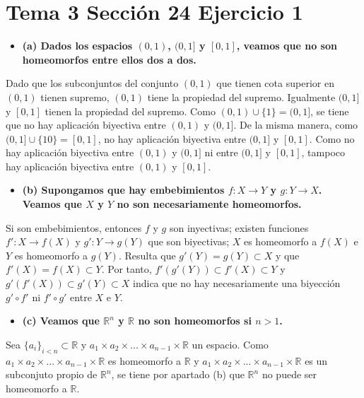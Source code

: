 \documentclass{article}
\begin{document}
\section{Tema 3 Sección 24 Ejercicio 1}
\begin{itemize}
\item \bf (a) \rm Dados los espacios $(0,1)$, $(0,1]$ y $[0,1]$, veamos que no son homeomorfos entre ellos dos a dos.
\end{itemize}
Dado que los subconjuntos del conjunto $(0,1)$ que tienen cota superior en $(0,1)$ tienen supremo, $(0,1)$ tiene la propiedad del supremo. Igualmente $(0,1]$ y $[0,1]$ tienen la propiedad del supremo. Como $(0,1)\cup \{1\}=(0,1]$, se tiene que no hay aplicación biyectiva entre $(0,1)$ y $(0,1]$. De la misma manera, como $(0,1]\cup \{1
0\}=[0,1]$, no hay aplicación biyectiva entre $(0,1]$ y $[0,1]$. Como no hay aplicación biyectiva entre $(0,1)$ y $(0,1]$ ni entre $(0,1]$ y $[0,1]$, tampoco hay aplicación biyectiva entre $(0,1)$ y $[0,1]$.
\begin{itemize}
\item \bf (b) \rm Supongamos que hay embebimientos $f:X\rightarrow Y$ y $g:Y\rightarrow X$. Veamos que $X$ y $Y$ no son necesariamente homeomorfos.
\end{itemize}
Si son embebimientos, entonces $f$ y $g$ son inyectivas; existen funciones $f':X\rightarrow f(X)$ y $g':Y\rightarrow g(Y)$ que son biyectivas; $X$ es homeomorfo a $f(X)$ e $Y$ es homeomorfo a $g(Y)$. Resulta que $g'(Y)=g(Y)\subset X$ y que $f'(X)=f(X)\subset Y$. Por tanto, $f'(g'(Y))\subset f'(X)\subset Y$ y $g'(f'(X))\subset g'(Y) \subset X$ indica que no hay necesariamente una biyección $g'\circ f'$ ni $f'\circ g'$ entre $X$ e $Y$.
\begin{itemize}
\item \bf (c) \rm Veamos que $\mathbb{R}^n$ y $\mathbb{R}$ no son homeomorfos si $n>1$.
\end{itemize}
Sea $\{a_i\}_{i<n}\subset \mathbb{R}$ y $a_1\times a_2\times...\times a_{n-1}\times \mathbb{R}$ un espacio. Como $a_1\times a_2\times...\times a_{n-1}\times \mathbb{R}$ es homeomorfo a $\mathbb{R}$ y $a_1\times a_2\times...\times a_{n-1}\times \mathbb{R}$ es un subconjuto propio de $\mathbb{R}^n$, se tiene por apartado (b) que $\mathbb{R}^n$ no puede ser homeomorfo a $\mathbb{R}$.
\end{document}
